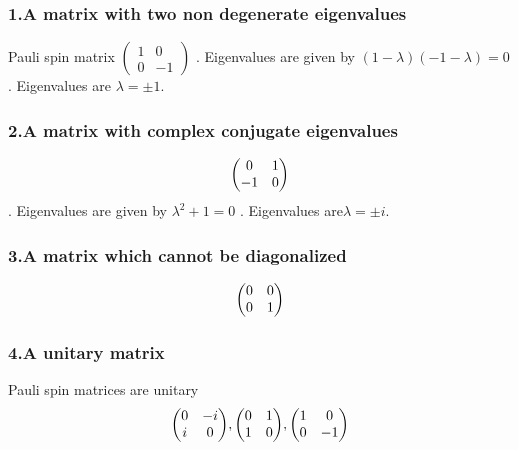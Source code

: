 \subsubsection*{1.A matrix with two non degenerate eigenvalues}

Pauli spin matrix \( \begin{pmatrix} 1 & 0\\ 0& -1 \end{pmatrix}\) . Eigenvalues are given by \( (1-\lambda)(-1-\lambda)=0 \) . Eigenvalues are  \( \lambda=\pm 1 \).

\subsubsection*{2.A matrix with complex conjugate eigenvalues}
\[
\mqty ( 0 & 1\\ -1& 0 )\]. Eigenvalues are given by \( \lambda^2+1=0 \) . Eigenvalues are\( \lambda=\pm i\).
\subsubsection*{3.A matrix which cannot be diagonalized}
\[\mqty( 0&0 \\ 0&1 )\]
\subsubsection*{4.A unitary matrix}
Pauli spin matrices are unitary
\[\mqty ( 0 & -i\\ i& 0 ), \mqty( 0 & 1\\ 1& 0), \mqty( 1 & 0\\ 0& -1)\]

